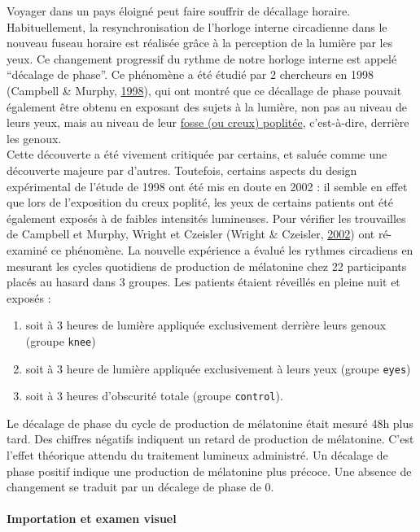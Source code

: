 \documentclass[a4paperpaper,]{article}
\providecommand{\tightlist}{%
  \setlength{\itemsep}{0pt}\setlength{\parskip}{0pt}}
\let\oldparagraph\paragraph
\renewcommand{\paragraph}[1]{\oldparagraph{#1}\mbox{}}
\begin{document}
Voyager dans un pays éloigné peut faire souffrir de décallage horaire. Habituellement, la resynchronisation de l'horloge interne circadienne dans le nouveau fuseau horaire est réalisée grâce à la perception de la lumière
par les yeux. Ce changement progressif du rythme de notre horloge interne est appelé ``décalage de phase''. Ce phénomène a été étudié par 2 chercheurs en 1998 (Campbell \& Murphy, \protect\hyperlink{ref-Campbell1998}{1998}), qui ont montré que ce décallage de phase pouvait également être obtenu en exposant des sujets à la lumière, non pas au niveau de leurs yeux, mais au niveau de leur \href{https://fr.wikipedia.org/wiki/Fosse_poplitée}{fosse (ou creux) poplitée}, c'est-à-dire, derrière les genoux.\\
Cette découverte a été vivement critiquée par certains, et saluée comme une découverte majeure par d'autres. Toutefois, certains aspects du design expérimental de l'étude de 1998 ont été mis en doute en 2002 : il semble en effet que lors de l'exposition du creux poplité, les yeux de certains patients ont été également exposés à de faibles intensités lumineuses. Pour vérifier les trouvailles de Campbell et Murphy, Wright et Czeisler (Wright \& Czeisler, \protect\hyperlink{ref-Wright2002}{2002}) ont ré-examiné ce phénomène. La nouvelle expérience a évalué les rythmes circadiens en mesurant les cycles quotidiens de production de mélatonine chez 22 participants placés au hasard dans 3 groupes. Les patients étaient réveillés en pleine nuit et exposés :

\begin{enumerate}
\def\labelenumi{\arabic{enumi}.}
\tightlist
\item
  soit à 3 heures de lumière appliquée exclusivement derrière leurs genoux (groupe \texttt{knee})
\item
  soit à 3 heure de lumière appliquée exclusivement à leurs yeux (groupe \texttt{eyes})
\item
  soit à 3 heures d'obscurité totale (groupe \texttt{control}).
\end{enumerate}

Le décalage de phase du cycle de production de mélatonine était mesuré 48h plus tard. Des chiffres négatifs indiquent un retard de production de mélatonine. C'est l'effet théorique attendu du traitement lumineux administré. Un décalage de phase positif indique une production de mélatonine plus précoce. Une absence de changement se traduit par un décalege de phase de 0.

\hypertarget{importation-et-examen-visuel-3}{%
\paragraph{Importation et examen visuel}\label{importation-et-examen-visuel-3}}
\end{document}
